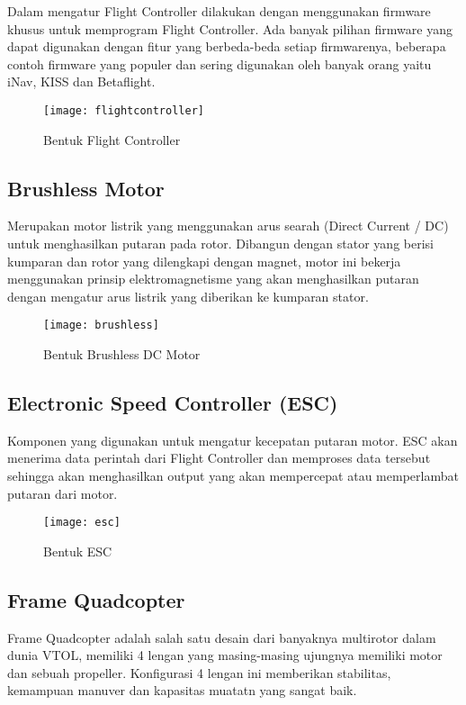 Dalam mengatur Flight Controller dilakukan dengan menggunakan firmware khusus untuk memprogram Flight Controller. Ada banyak pilihan firmware yang dapat digunakan dengan fitur yang berbeda-beda setiap firmwarenya, beberapa contoh firmware yang populer dan sering digunakan oleh banyak orang yaitu iNav, KISS dan Betaflight.

\begin{figure}[H]
	\centering
	\texttt{[image: flightcontroller]}
	\caption{Bentuk Flight Controller}
	\label{fig:fc}
\end{figure}

\subsection{Brushless Motor}
Merupakan motor listrik yang menggunakan arus searah (Direct Current / DC) untuk menghasilkan putaran pada rotor. Dibangun dengan stator yang berisi kumparan dan rotor yang dilengkapi dengan magnet, motor ini bekerja menggunakan prinsip elektromagnetisme yang akan menghasilkan putaran dengan mengatur arus listrik yang diberikan ke kumparan stator.

\begin{figure}[H]
	\centering
	\texttt{[image: brushless]}
	\caption{Bentuk Brushless DC Motor}
	\label{fig:brushless}
\end{figure}

\subsection{Electronic Speed Controller (ESC) }
Komponen yang digunakan untuk mengatur kecepatan putaran motor. ESC akan menerima data perintah dari Flight Controller dan memproses data tersebut sehingga akan menghasilkan output yang akan mempercepat atau memperlambat putaran dari motor.

\begin{figure}[H]
	\centering
	\texttt{[image: esc]}
	\caption{Bentuk ESC}
	\label{fig:esc}
\end{figure}

\subsection{Frame Quadcopter}
Frame Quadcopter adalah salah satu desain dari banyaknya multirotor dalam dunia VTOL, memiliki 4 lengan yang masing-masing ujungnya memiliki motor dan sebuah propeller. Konfigurasi 4 lengan ini memberikan stabilitas, kemampuan manuver dan kapasitas muatatn yang sangat baik.

